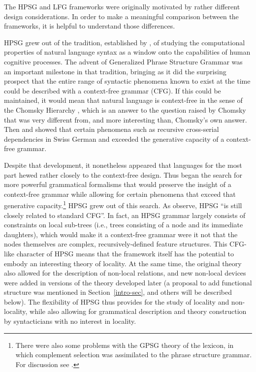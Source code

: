 The HPSG and LFG frameworks were originally motivated by rather different design considerations.  In
order to make a meaningful comparison between the frameworks, it is helpful to understand those
differences.

HPSG grew out of the tradition, established by \citet{Chomsky57a}, of studying the computational
properties of natural language syntax as a window onto the capabilities of human cognitive
processes.  The advent of Generalized Phrase Structure Grammar\indexgpsg \citep{GKPS85a} was an
important milestone in that tradition, bringing as it did the surprising prospect that the entire
range of syntactic phenomena known to exist at the time could be described with a context-free
grammar (CFG).  If this could be maintained, it would mean that natural language is context-free in
the sense of the Chomsky Hierarchy \citep{Chomsky57a}, which is an answer to the question raised by
Chomsky that was very different from, and more interesting than, Chomsky's own answer.  Then
\citet{Shieber85a} and \citet{Culy85a} showed that certain phenomena such as recursive cross-serial
dependencies in Swiss German and  exceeded the generative capacity of
a context-free grammar.

\largerpage\enlargethispage{3pt}
Despite that development, it nonetheless appeared that languages for the most part hewed rather
closely to the context-free design.  Thus began the search for more powerful grammatical formalisms
that would preserve the insight of a context-free grammar while allowing for certain phenomena that
exceed that generative capacity.\footnote{There were also some problems with the GPSG theory of the
  lexicon, in which complement selection was assimilated to the phrase structure grammar.  For
  discussion see \citet[Section~4.1]{MWArgSt}.}  HPSG grew out of this search. As
\citet[83]{SWB2003a} observe, HPSG ``is still closely related to standard CFG''.  In fact, an HPSG
grammar largely consists of constraints on local sub-trees (i.e., trees consisting of a node and its
immediate daughters), which would make it a context-free grammar were it not that the nodes
themselves are complex, recursively-defined feature structures.  This CFG-like character of HPSG
means that the framework itself has the potential to embody an interesting theory of locality.  At
the same time, the original theory also allowed for the description of non-local relations, and new
non-local devices were added in versions of the theory developed later (a proposal to add functional
structure was mentioned in Section~\ref{intro-sec}, and others will be described below).  The
flexibility of HPSG thus provides for the study of locality and non-locality, while also allowing
for grammatical description and theory construction by syntacticians with no interest in locality.


